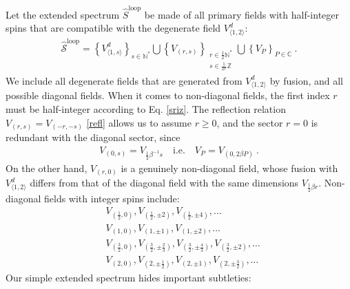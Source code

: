 \documentclass[12pt, a4paper]{article}
\begin{document}
Let the extended spectrum $\widehat{S}^\text{loop}$ be made of all primary fields with half-integer spins that are compatible with the degenerate field $V^d_{\langle 1,2\rangle}$:
\begin{align}
 \boxed{\widehat{\mathcal{S}}^\text{loop} = \left\{V^d_{\langle 1,s\rangle}\right\}_{s\in\mathbb{N}^*}  \bigcup \left\{V_{(r,s)}\right\}_{\substack{r\in \frac12\mathbb{N}^*\\ s\in\frac{1}{2r}\mathbb{Z}}}\bigcup \left\{ V_P\right\}_{P\in\mathbb{C}} } \ .
 \label{sloop}
\end{align}
We include all degenerate fields that are generated from $V^d_{\langle 1,2\rangle}$ by fusion, and all possible diagonal fields. When it comes to non-diagonal fields, the first index $r$ must be half-integer according to Eq. \eqref{sriz}. The reflection relation $V_{(r,s)}=V_{(-r,-s)}$ \eqref{refl} allows us to assume $r\geq 0$, and the sector $r=0$ is redundant with the diagonal sector, since 
\begin{align}
 \boxed{V_{(0,s)} = V_{\frac12\beta^{-1}s}  \quad \text{i.e.} \quad V_P = V_{(0,2\beta P)}} \ .
 \label{sP}
\end{align}
On the other hand, $V_{(r,0)}$ is a genuinely non-diagonal field, whose fusion with $V^d_{\langle 1,2\rangle}$ differs from that of the diagonal field with the same dimensions $V_{\frac12\beta r}$. 
Non-diagonal fields with integer spins include:
\begin{subequations}
\label{vex}
\begin{align}
 & V_{(\frac12, 0)}, V_{(\frac12,\pm 2)}, V_{(\frac12, \pm 4)}, \dots
 \\
 & V_{(1,0)}, V_{(1,\pm 1)}, V_{(1,\pm 2)}, \dots 
 \\
 & V_{(\frac32, 0)}, V_{(\frac32, \pm\frac23)}, V_{(\frac32,\pm \frac43)} , V_{(\frac32,\pm 2)}, \dots
 \\
 & V_{(2, 0)}, V_{(2,\pm\frac12)}, V_{(2,\pm 1)}, V_{(2,\pm\frac32)}, \dots 
\end{align}
\end{subequations}
Our simple extended spectrum hides important subtleties: 
\end{document}
